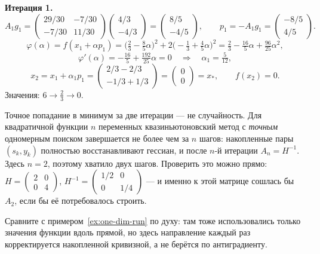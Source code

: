 \begin{example}
\medskip
\noindent\textbf{Итерация 1.}
\[
  A_1 g_1
   = \begin{pmatrix} 29/30 & -7/30 \\ -7/30 & 11/30 \end{pmatrix}
     \begin{pmatrix} 4/3 \\ -4/3 \end{pmatrix}
   = \begin{pmatrix} 8/5 \\ -4/5 \end{pmatrix} ,
  \qquad
  p_1 = -A_1 g_1 = \begin{pmatrix} -8/5 \\ 4/5 \end{pmatrix} .
\]
\[
  \varphi(\alpha) = f(x_1 + \alpha p_1)
    = \Big(\tfrac23 - \tfrac85\alpha\Big)^2
      + 2\Big(-\tfrac13 + \tfrac45\alpha\Big)^2
    = \tfrac23 - \tfrac{16}{5}\alpha + \tfrac{96}{25}\alpha^2 ,
\]
\[
  \varphi'(\alpha) = -\tfrac{16}{5} + \tfrac{192}{25}\alpha = 0
  \quad\Longrightarrow\quad
  \alpha_1 = \tfrac{5}{12} ,
\]
\[
  x_2 = x_1 + \alpha_1 p_1
      = \begin{pmatrix} 2/3 - 2/3 \\ -1/3 + 1/3 \end{pmatrix}
      = \begin{pmatrix} 0 \\ 0 \end{pmatrix} = x_* ,
  \qquad f(x_2) = 0 .
\]
Значения: $6 \to \tfrac23 \to 0$.
\end{example}

\begin{idea}
Точное попадание в минимум за две итерации — не случайность. Для
квадратичной функции $n$ переменных квазиньютоновский метод с \emph{точным}
одномерным поиском завершается не более чем за $n$ шагов: накопленные пары
$(s_k, y_k)$ полностью восстанавливают гессиан, и после $n$-й итерации
$A_n = H^{-1}$. Здесь $n = 2$, поэтому хватило двух шагов. Проверить это можно
прямо: $H = \begin{pmatrix} 2 & 0 \\ 0 & 4 \end{pmatrix}$,
$H^{-1} = \begin{pmatrix} 1/2 & 0 \\ 0 & 1/4 \end{pmatrix}$ — и именно к этой
матрице сошлась бы $A_2$, если бы её потребовалось строить.

Сравните с примером~\ref{ex:one-dim-run} по духу: там тоже использовались
только значения функции вдоль прямой, но здесь направление каждый раз
корректируется накопленной кривизной, а не берётся по антиградиенту.
\end{idea}
